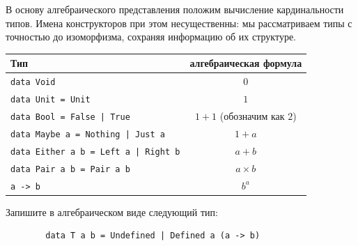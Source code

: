 В основу алгебраического представления положим вычисление кардинальности типов.
Имена конструкторов при этом несущественны: мы рассматриваем типы с точностью до изоморфизма, сохраняя информацию об их структуре.
\begin{center}
    \begin{tabular}{|p{}|c|}
        \hline
        Тип                                                      & алгебраическая формула      \\
        \hline
        \texttt{data Void}                          & $0$                         \\
        \texttt{data Unit = Unit}                   & $1$                         \\
        \texttt{data Bool = False | True}           & $1 + 1$ (обозначим как $2$) \\
        \texttt{data Maybe a = Nothing | Just a}    & $1 + a$                     \\
        \texttt{data Either a b = Left a | Right b} & $a + b$                     \\
        \texttt{data Pair a b = Pair a b}           & $a \times b$                \\
        \texttt{a -> b}                             & $b^a$                       \\
        \hline
    \end{tabular}
\end{center}

\begin{task}
    Запишите в алгебраическом виде следующий тип:
    \begin{verbatim}
        data T a b = Undefined | Defined a (a -> b)
    \end{verbatim}
\end{task}

